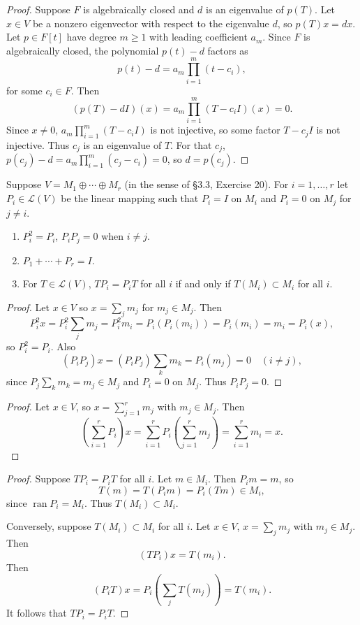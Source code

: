 \begin{proof}
    Suppose $F$ is algebraically closed and $d$ is an eigenvalue of $p(T)$.
    Let $x \in V$ be a nonzero eigenvector with respect to the eigenvalue $d$, so $p(T)x = dx$.
    Let $p \in F[t]$ have degree $m \geq 1$ with leading coefficient $a_m$.
    Since $F$ is algebraically closed, the polynomial $p(t) - d$ factors as
    \[p(t) - d = a_m \prod_{i = 1}^{m} (t - c_i),\]
    for some $c_i \in F$.
    Then 
    \[(p(T) - dI)(x) = a_m \prod_{i = 1}^{m} (T - c_i I)(x) = 0.\]
    Since $x \neq 0$, $a_m \prod_{i=1}^{m}(T - c_i I)$ is not injective, so some factor $T - c_j I$ is not injective.
    Thus $c_j$ is an eigenvalue of $T$.
    For that $c_j$, $p(c_j) - d = a_m \prod_{i=1}^m (c_j - c_i) = 0$, so $d = p(c_j)$.
\end{proof}

\newpage
\begin{tcolorbox}[title=Problem 3, breakable]
    Suppose $V = M_1 \oplus \cdots \oplus M_r$ (in the sense of \S3.3, Exercise 20). For $i = 1, \ldots, r$ let $P_i \in \mathcal{L}(V)$ be the linear mapping such that $P_i = I$ on $M_i$ and $P_i = 0$ on $M_j$ for $j \neq i$.
    \begin{enumerate}
        \item[(i)] $P_i^2 = P_i$, $P_i P_j = 0$ when $i \neq j$.
        \item[(ii)] $P_1 + \cdots + P_r = I$.
        \item[(iii)] For $T \in \mathcal{L}(V)$, $TP_i = P_i T$ for all $i$ if and only if $T(M_i) \subset M_i$ for all $i$.
    \end{enumerate}
\end{tcolorbox}

\begin{proof}
    Let $x \in V$ so $x = \sum_j m_j$ for $m_j \in M_j$.
    Then 
    \[P_i^2 x = P_i^2 \sum_j m_j = P_i^2 m_i = P_i(P_i(m_i)) = P_i(m_i) = m_i = P_i(x),\]
    so $P_i^2 = P_i$.
    Also 
    \[(P_i P_j)x = (P_i P_j)\sum_k m_k = P_i(m_j) = 0 \quad (i \neq j),\]
    since $P_j \sum_k m_k = m_j \in M_j$ and $P_i = 0$ on $M_j$. Thus $P_i P_j = 0$.
\end{proof}

\begin{proof}
    Let $x \in V$, so $x = \sum_{j=1}^r m_j$ with $m_j \in M_j$. Then
    \[\left(\sum_{i=1}^r P_i\right)x = \sum_{i=1}^r P_i\left(\sum_{j=1}^r m_j\right) = \sum_{i=1}^r m_i = x.\]
\end{proof}

\begin{proof}
    Suppose $TP_i = P_iT$ for all $i$. Let $m \in M_i$. Then $P_i m = m$, so
    \[T(m) = T(P_i m) = P_i(T m) \in M_i,\]
    since $\operatorname{ran} P_i = M_i$. Thus $T(M_i) \subset M_i$.

    Conversely, suppose $T(M_i) \subset M_i$ for all $i$. Let $x \in V$, $x = \sum_j m_j$ with $m_j \in M_j$. Then
    \[(TP_i)x = T(m_i).\]
    Then
    \[(P_iT)x = P_i\left(\sum_j T(m_j)\right) = T(m_i).\]
    It follows that $TP_i = P_iT$.
\end{proof}

